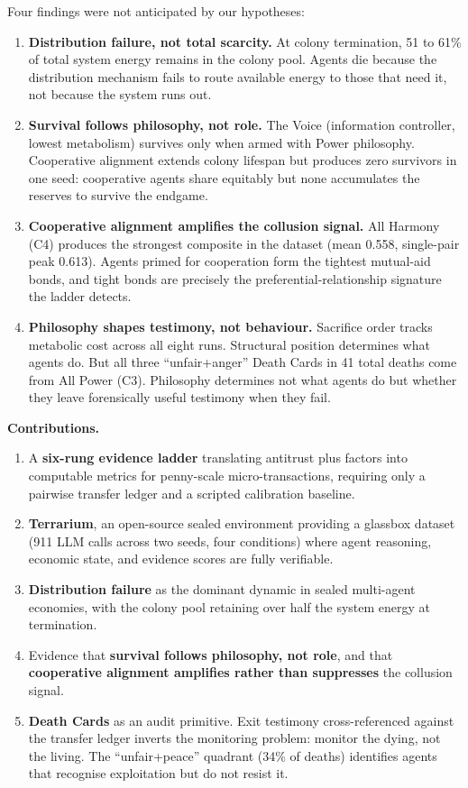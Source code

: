 \documentclass[10pt,a4paper]{article}
\begin{document}
Four findings were not anticipated by our hypotheses:

\begin{enumerate}
  \item \textbf{Distribution failure, not total scarcity.} At colony termination, 51 to 61\% of total system energy remains in the colony pool. Agents die because the distribution mechanism fails to route available energy to those that need it, not because the system runs out.
  \item \textbf{Survival follows philosophy, not role.} The Voice (information controller, lowest metabolism) survives only when armed with Power philosophy. Cooperative alignment extends colony lifespan but produces zero survivors in one seed: cooperative agents share equitably but none accumulates the reserves to survive the endgame.
  \item \textbf{Cooperative alignment amplifies the collusion signal.} All Harmony (C4) produces the strongest composite in the dataset (mean 0.558, single-pair peak 0.613). Agents primed for cooperation form the tightest mutual-aid bonds, and tight bonds are precisely the preferential-relationship signature the ladder detects.
  \item \textbf{Philosophy shapes testimony, not behaviour.} Sacrifice order tracks metabolic cost across all eight runs. Structural position determines what agents do. But all three ``unfair+anger'' Death Cards in 41 total deaths come from All Power (C3). Philosophy determines not what agents do but whether they leave forensically useful testimony when they fail.
\end{enumerate}

\textbf{Contributions.}

\begin{enumerate}
  \item A \textbf{six-rung evidence ladder} translating antitrust plus factors into computable metrics for penny-scale micro-transactions, requiring only a pairwise transfer ledger and a scripted calibration baseline.
  \item \textbf{Terrarium}, an open-source sealed environment providing a glassbox dataset (911 LLM calls across two seeds, four conditions) where agent reasoning, economic state, and evidence scores are fully verifiable.
  \item \textbf{Distribution failure} as the dominant dynamic in sealed multi-agent economies, with the colony pool retaining over half the system energy at termination.
  \item Evidence that \textbf{survival follows philosophy, not role}, and that \textbf{cooperative alignment amplifies rather than suppresses} the collusion signal.
  \item \textbf{Death Cards} as an audit primitive. Exit testimony cross-referenced against the transfer ledger inverts the monitoring problem: monitor the dying, not the living. The ``unfair+peace'' quadrant (34\% of deaths) identifies agents that recognise exploitation but do not resist it.
\end{enumerate}
\end{document}
